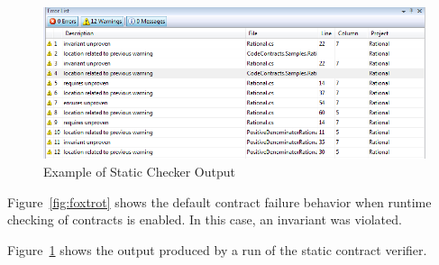 \documentclass[10pt,twocolumn]{article}
\begin{document}
\begin{figure}[tb]
\begin{center}
  \includegraphics[width=2\columnwidth]{staticCheckerOutput.png}
\end{center}
\caption{Example of Static Checker Output}
\label{fig:clousot}
\end{figure}

Figure~\ref{fig:foxtrot} shows the default contract failure behavior
when runtime checking of contracts is enabled. In this case, an
invariant was violated.

Figure~\ref{fig:clousot} shows the output produced by a run of the
static contract verifier.




\end{document}
